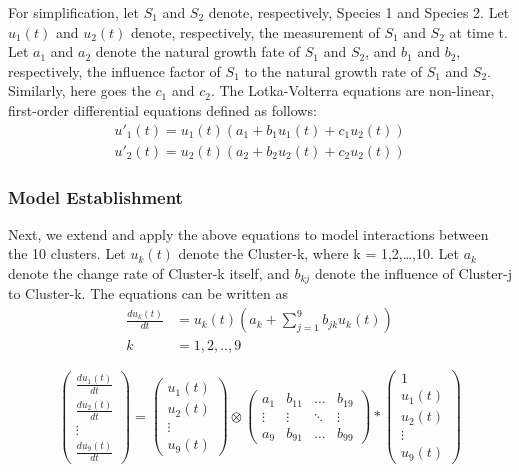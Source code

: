 \documentclass[12pt]{article}
\begin{document}
For simplification, let $S_{1}$ and $S_{2}$ denote, respectively, Species 1 and Species 2. Let $u_{1}(t)$ and $u_{2}(t)$ denote, respectively, the measurement of $S_{1}$ and $S_{2}$ at time t. Let $a_{1}$ and $a_{2}$ denote the natural growth fate of $S_{1}$ and $S_{2}$, and $b_{1}$ and $b_{2}$, respectively, the influence factor of $S_{1}$ to the natural growth rate of $S_{1}$ and $S_{2}$. Similarly, here goes the $c_{1}$ and $c_{2}$. The Lotka-Volterra equations are non-linear, first-order differential equations defined as follows:
\begin{gather}
	u'_{1}(t) = u_{1}(t)(a_{1} + b_{1}u_{1}(t) + c_{1}u_{2}(t)) \label{equ41}\\
	u'_{2}(t) = u_{2}(t)(a_{2} + b_{2}u_{2}(t) + c_{2}u_{2}(t))
\end{gather}

\subsubsection{Model Establishment}
Next, we extend and apply the above equations to model interactions between the 10 clusters. Let $u_{k}(t)$ denote the Cluster-k, where k = 1,2,…,10. Let $a_{k}$ denote the change rate of Cluster-k itself, and $b_{kj}$ denote the influence of Cluster-j to Cluster-k. The equations can be written as
\begin{equation}
	\begin{split}
	\frac{du_{k}(t)}{dt} &= u_{k}(t)(a_{k} + \sum_{j=1}^{9}b_{jk}u_{k}(t)) \\
	k &= 1,2,..,9
	\end{split}
\end{equation}

\begin{equation}
	\begin{pmatrix}
		\frac{du_{1}(t)}{dt} \\
		\frac{du_{2}(t)}{dt} \\
		\vdots \\
		\frac{du_{9}(t)}{dt}	
	\end{pmatrix}
	=
	\begin{pmatrix}
		u_{1}(t) \\
		u_{2}(t) \\
		\vdots \\
		u_{9}(t)
	\end{pmatrix}
	\otimes
	\begin{pmatrix}
		a_{1} & b_{11} & \ldots & b_{19}\\
		\vdots & \vdots & \ddots & \vdots\\
		a_{9} & b_{91} & \ldots & b_{99}
	\end{pmatrix}
	\ast
	\begin{pmatrix}
		1 \\
		u_{1}(t) \\
		u_{2}(t) \\
		\vdots \\
		u_{9}(t)
	\end{pmatrix}
\end{equation}
\end{document}
